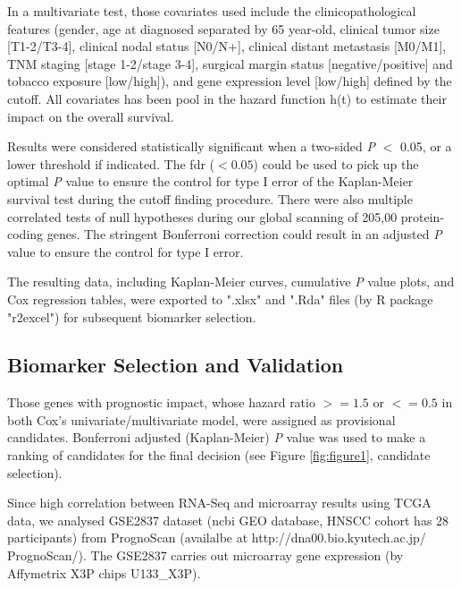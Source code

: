 \documentclass[jpm,article,submit,moreauthors,pdftex]{Definitions/mdpi}
\newenvironment{MyColorPar}[1]{%
    \leavevmode\color{#1}\ignorespaces%
}{%
}%
\begin{document}
\begin{paracol}{2}
\begin{MyColorPar}{red}
In a multivariate test, those covariates used include the clinicopathological features (gender, age at diagnosed separated by 65 year-old, clinical tumor size [T1-2/T3-4], clinical nodal status [N0/N+], clinical distant metastasis [M0/M1], TNM staging [stage 1-2/stage 3-4], surgical margin status [negative/positive] and tobacco exposure [low/high]), and gene expression level [low/high] defined by the cutoff.
All covariates has been pool in the hazard function h(t) to estimate their impact on the overall survival.
\end{MyColorPar}


Results were considered statistically significant when a two-sided \textit{P} $<$ 0.05, or a lower threshold if indicated.
The \acrfull{fdr} ($< 0.05$) could be used to pick up the optimal \textit{P} value to ensure the control for type I error of the Kaplan-Meier survival test during the cutoff finding procedure.
There were also multiple correlated tests of null hypotheses 
during our global scanning of 205,00 protein-coding genes. The stringent Bonferroni correction could result in an adjusted \textit{P} value to ensure the control for type I error. 

The resulting data, including Kaplan-Meier curves, cumulative \textit{P} value plots, and Cox regression tables, were exported to ".xlsx" and ".Rda" files (by R package "r2excel") for subsequent biomarker selection.


\subsection{Biomarker Selection and Validation}
Those genes with prognostic impact, whose hazard ratio $>=1.5$ or $<=0.5$ in both Cox's univariate/multivariate model, were assigned as provisional candidates.
Bonferroni adjusted (Kaplan-Meier) \textit{P} value was used to make a ranking of candidates for the final decision (see Figure \ref{fig:figure1}, candidate selection).

Since high correlation between RNA-Seq and microarray results using TCGA data\cite{Guo2013}\cite{Chen2017c},
we analysed GSE2837 dataset (\acrfull{ncbi} GEO database\cite{Chung2006}, HNSCC cohort has 28 participants) from PrognoScan (availalbe at http://dna00.bio.kyutech.ac.jp/\\PrognoScan/)\cite{Mizuno2009a}.
The GSE2837 carries out %
microarray gene expression (by Affymetrix X3P chips U133\_X3P).


\end{paracol}
\end{document}
